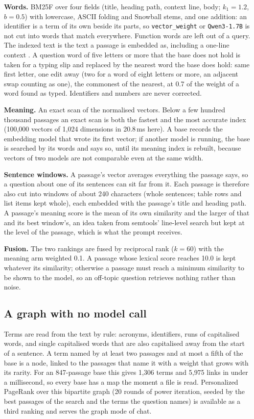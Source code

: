 \textbf{Words.} BM25F over four fields (title, heading path, context line,
body; $k_1=1.2$, $b=0.5$) with lowercase, ASCII folding and Snowball stems,
and one addition: an identifier is a term of its own beside its parts, so
\texttt{vector\_weight} or \texttt{Qwen3-1.7B} is not cut into words that
match everywhere. Function words are left out of a query. The indexed text is
the text a passage is embedded as, including a one-line context
\cite{anthropic2024contextual}. A question word of five letters or more that
the base does not hold is taken for a typing slip and replaced by the nearest
word the base does hold: same first letter, one edit away (two for a word of
eight letters or more, an adjacent swap counting as one), the commonest of the
nearest, at 0.7 of the weight of a word found as typed. Identifiers and
numbers are never corrected.

\textbf{Meaning.} An exact scan of the normalised vectors. Below a few hundred
thousand passages an exact scan is both the fastest and the most accurate
index (100{,}000 vectors of 1{,}024 dimensions in 20.8\,ms here). A base
records the embedding model that wrote its first vector; if another model is
running, the base is searched by its words and says so, until its meaning
index is rebuilt, because vectors of two models are not comparable even at
the same width.

\textbf{Sentence windows.} A passage's vector averages everything the passage
says, so a question about one of its sentences can sit far from it. Each
passage is therefore also cut into windows of about 240 characters (whole
sentences; table rows and list items kept whole), each embedded with the
passage's title and heading path. A passage's meaning score is the mean of
its own similarity and the larger of that and its best window's, an idea taken
from semtools' line-level search \cite{semtools2026} but kept at the level of
the passage, which is what the prompt receives.

\textbf{Fusion.} The two rankings are fused by reciprocal rank
\cite{cormack2009rrf} ($k=60$) with the meaning arm weighted 0.1. A passage
whose lexical score reaches 10.0 is kept whatever its similarity; otherwise a
passage must reach a minimum similarity to be shown to the model, so an
off-topic question retrieves nothing rather than noise.

\subsection{A graph with no model call}
\label{sec:kb:textgraph}
Terms are read from the text by rule: acronyms, identifiers, runs of
capitalised words, and single capitalised words that are also capitalised
away from the start of a sentence. A term named by at least two passages and
at most a fifth of the base is a node, linked to the passages that name it
with a weight that grows with its rarity. For an 847-passage base this gives
1{,}306 terms and 5{,}975 links in under a millisecond, so every base has a
map the moment a file is read. Personalized PageRank over this bipartite
graph (20 rounds of power iteration, seeded by the best passages of the
search and the terms the question names) is available as a third ranking and
serves the graph mode of chat.


